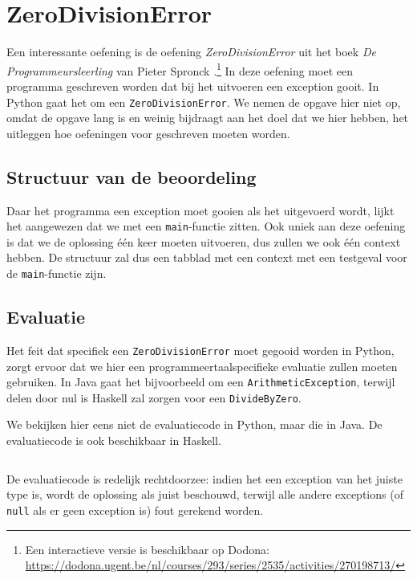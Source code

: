 \inputminted{json}{sources/echo-function/one-testcase.tson}

\section{ZeroDivisionError}\label{sec:oefening-zero}

Een interessante oefening is de oefening \emph{ZeroDivisionError} uit het boek \emph{De Programmeursleerling} van Pieter Spronck \autocite{programmeursleerling}.\footnote{Een interactieve versie is beschikbaar op Dodona: \url{https://dodona.ugent.be/nl/courses/293/series/2535/activities/270198713/}}
In deze oefening moet een programma geschreven worden dat bij het uitvoeren een exception gooit.
In Python gaat het om een \texttt{ZeroDivisionError}.
We nemen de opgave hier niet op, omdat de opgave lang is en weinig bijdraagt aan het doel dat we hier hebben, het uitleggen hoe oefeningen voor \tested{} geschreven moeten worden.

\subsection{Structuur van de beoordeling}\label{subsec:oefening-zero-structuur}

Daar het programma een exception moet gooien als het uitgevoerd wordt, lijkt het aangewezen dat we met een \texttt{main}-functie zitten.
Ook uniek aan deze oefening is dat we de oplossing één keer moeten uitvoeren, dus zullen we ook één context hebben.
De structuur zal dus een tabblad met een context met een testgeval voor de \texttt{main}-functie zijn.

\subsection{Evaluatie}\label{subsec:oefening-zero-evaluatie}

Het feit dat specifiek een \texttt{ZeroDivisionError} moet gegooid worden in Python, zorgt ervoor dat we hier een programmeertaalspecifieke evaluatie zullen moeten gebruiken.
In Java gaat het bijvoorbeeld om een \texttt{ArithmeticException}, terwijl delen door nul is Haskell zal zorgen voor een \texttt{DivideByZero}.

We bekijken hier eens niet de evaluatiecode in Python, maar die in Java.
De evaluatiecode is ook beschikbaar in Haskell.

\inputminted{java}{sources/division-evaluator.java}

De evaluatiecode is redelijk rechtdoorzee: indien het een exception van het juiste type is, wordt de oplossing als juist beschouwd, terwijl alle andere exceptions (of \texttt{null} als er geen exception is) fout gerekend worden.

